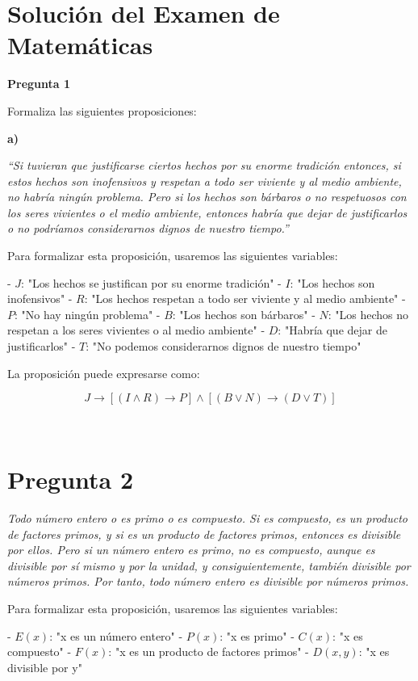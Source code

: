 \documentclass{article}
\begin{document}
\section*{Solución del Examen de Matemáticas}

\textbf{Pregunta 1}

Formaliza las siguientes proposiciones:

\textbf{a)}

\textit{“Si tuvieran que justificarse ciertos hechos por su enorme tradición entonces, si estos hechos son inofensivos y respetan a todo ser viviente y al medio ambiente, no habría ningún problema. Pero si los hechos son bárbaros o no respetuosos con los seres vivientes o el medio ambiente, entonces habría que dejar de justificarlos o no podríamos considerarnos dignos de nuestro tiempo.”}

Para formalizar esta proposición, usaremos las siguientes variables:

- \( J \): "Los hechos se justifican por su enorme tradición"
- \( I \): "Los hechos son inofensivos"
- \( R \): "Los hechos respetan a todo ser viviente y al medio ambiente"
- \( P \): "No hay ningún problema"
- \( B \): "Los hechos son bárbaros"
- \( N \): "Los hechos no respetan a los seres vivientes o al medio ambiente"
- \( D \): "Habría que dejar de justificarlos"
- \( T \): "No podemos considerarnos dignos de nuestro tiempo"

La proposición puede expresarse como:

\[ J \rightarrow [(I \land R) \rightarrow P] \land [(B \lor N) \rightarrow (D \lor T)] \]

\
\section*{Pregunta 2}

\textit{Todo número entero o es primo o es compuesto. Si es compuesto, es un producto de factores primos, y si es un producto de factores primos, entonces es divisible por ellos. Pero si un número entero es primo, no es compuesto, aunque es divisible por sí mismo y por la unidad, y consiguientemente, también divisible por números primos. Por tanto, todo número entero es divisible por números primos.}

Para formalizar esta proposición, usaremos las siguientes variables:

- \( E(x) \): "x es un número entero"
- \( P(x) \): "x es primo"
- \( C(x) \): "x es compuesto"
- \( F(x) \): "x es un producto de factores primos"
- \( D(x, y) \): "x es divisible por y"
\end{document}
